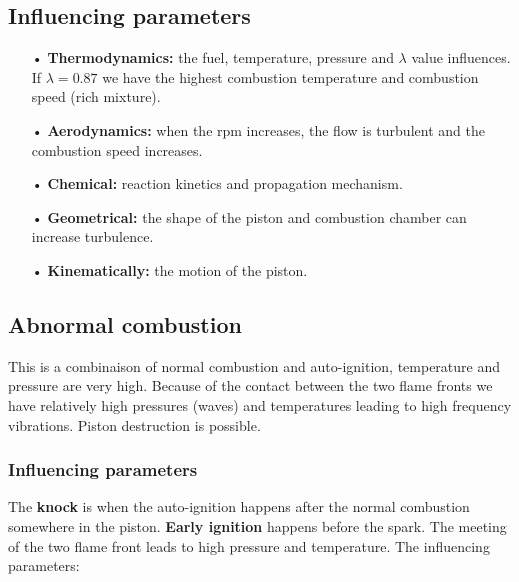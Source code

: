 \subsection{Influencing parameters}
	\begin{itemize}
	\item[•] \textbf{Thermodynamics:} the fuel, temperature, pressure and $\lambda$ value influences. If $\lambda = 0.87$ we have the highest combustion temperature and combustion speed (rich mixture). 
	\item[•] \textbf{Aerodynamics:} when the rpm increases, the flow is turbulent and the combustion speed increases. 
	\item[•] \textbf{Chemical:} reaction kinetics and propagation mechanism. 
	\item[•] \textbf{Geometrical:} the shape of the piston and combustion chamber can increase turbulence. 
	\item[•] \textbf{Kinematically:} the motion of the piston.
	\end{itemize}
	
\subsection{Abnormal combustion}
	This is a combinaison of normal combustion and auto-ignition, temperature and pressure are very high. Because of the contact between the two flame fronts we have relatively high pressures (waves) and temperatures leading to high frequency vibrations. Piston destruction is possible. 
	
\subsubsection{Influencing parameters}	
	The \textbf{knock} is when the auto-ignition happens after the normal combustion somewhere in the piston. \textbf{Early ignition} happens before the spark. The meeting of the two flame front leads to high pressure and temperature. The influencing parameters: \\
	
